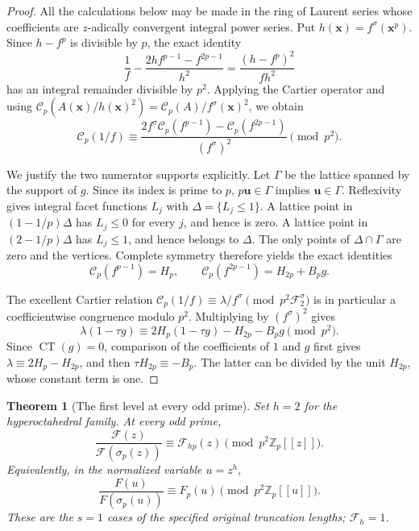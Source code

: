 \documentclass[11pt,a4paper]{article}
\newtheorem{theorem}{Theorem}[section]
\theoremstyle{definition}\newtheorem{definition}[theorem]{Definition}
\theoremstyle{remark}\newtheorem{remark}[theorem]{Remark}
\numberwithin{equation}{section}
\begin{document}
\begin{proof}
All the calculations below may be made in the ring of Laurent series
whose coefficients are \(z\)-adically convergent integral power series.
Put \(h(\mathbf{x})=f^\sigma(\mathbf{x}^p)\).  Since \(h-f^p\) is
divisible by \(p\), the exact identity
\[
 \frac1f-\frac{2hf^{p-1}-f^{2p-1}}{h^2}
 =\frac{(h-f^p)^2}{fh^2}
\]
has an integral remainder divisible by \(p^2\).  Applying the Cartier
operator and using
\(\mathscr C_p(A(\mathbf{x})/h(\mathbf{x})^2)
 =\mathscr C_p(A) / f^\sigma(\mathbf{x})^2\), we obtain
\[
 \mathscr C_p(1/f)
 \equiv
 \frac{2f^\sigma\mathscr C_p(f^{p-1})
              -\mathscr C_p(f^{2p-1})}{(f^\sigma)^2}
 \pmod{p^2}.
\]

We justify the two numerator supports explicitly.  Let \(\Gamma\)
be the lattice spanned by the support of \(g\).  Since its index is
prime to \(p\), \(p\mathbf{u}\in\Gamma\) implies
\(\mathbf{u}\in\Gamma\).  Reflexivity gives integral facet functions
\(L_j\) with \(\Delta=\{L_j\leq1\}\).  A lattice point in
\((1-1/p)\Delta\) has \(L_j\leq0\) for every \(j\), and hence is
zero.  A lattice point in \((2-1/p)\Delta\) has \(L_j\leq1\), and
hence belongs to \(\Delta\).  The only points of
\(\Delta\cap\Gamma\) are zero and the vertices.  Complete symmetry
therefore yields the exact identities
\[
 \mathscr C_p(f^{p-1})=H_p,
 \qquad
 \mathscr C_p(f^{2p-1})=H_{2p}+B_p g.
\]


The excellent Cartier relation
\(\mathscr C_p(1/f)\equiv\lambda/f^\sigma
 \pmod{p^2\mathscr F_2^\sigma}\)
is in particular a coefficientwise congruence modulo \(p^2\).
Multiplying by \((f^\sigma)^2\) gives
\[
 \lambda(1-\tau g)
 \equiv 2H_p(1-\tau g)-H_{2p}-B_p g\pmod{p^2}.
\]
Since \(\operatorname{CT}(g)=0\), comparison of the coefficients of
\(1\) and \(g\) first gives
\(\lambda\equiv2H_p-H_{2p}\), and then
\(\tau H_{2p}\equiv-B_p\).
The latter can be divided by the unit \(H_{2p}\), whose constant
term is one.
\end{proof}

\begin{theorem}[The first level at every odd prime]
\label{OP:L:thm:first-all-dim}
Set $h=2$ for the hyperoctahedral family.  At every odd prime,
\[
 \frac{\mathcal F(z)}{\mathcal F(\sigma_p(z))}
 \equiv\mathcal F_{hp}(z)\pmod{p^2\mathbb Z_p[[z]]}.
\]
Equivalently, in the normalized variable \(u=z^h\),
\[
 \frac{F(u)}{F(\sigma_p(u))}
 \equiv F_p(u)\pmod{p^2\mathbb Z_p[[u]]}.
\]
These are the \(s=1\) cases of the specified original truncation
lengths; \(\mathcal F_h=1\).
\end{theorem}
\end{document}
